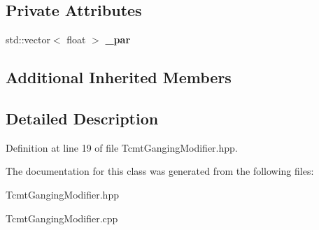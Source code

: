 \subsection*{Private Attributes}
\begin{DoxyCompactItemize}
\item 
std\-::vector$<$ float $>$ {\bfseries \-\_\-par}\label{classdigisim_1_1TcmtGangingModifier_ac8333fe6c9ef5c4570da91cc968b1b84}

\end{DoxyCompactItemize}
\subsection*{Additional Inherited Members}


\subsection{Detailed Description}


Definition at line 19 of file Tcmt\-Ganging\-Modifier.\-hpp.



The documentation for this class was generated from the following files\-:\begin{DoxyCompactItemize}
\item 
Tcmt\-Ganging\-Modifier.\-hpp\item 
Tcmt\-Ganging\-Modifier.\-cpp\end{DoxyCompactItemize}
